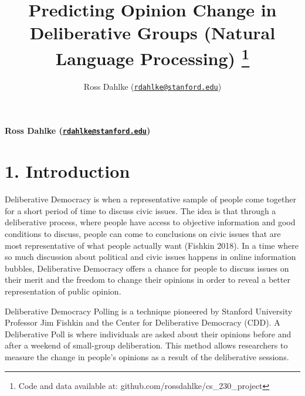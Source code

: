 \documentclass[12pt,]{article}
\title{Predicting Opinion Change in Deliberative Groups (Natural Language
Processing) \thanks{Code and data available at: github.com/rossdahlke/cs\_230\_project}  }
\author{\Large Ross Dahlke
(\href{mailto:rdahlke@stanford.edu}{\nolinkurl{rdahlke@stanford.edu}})\vspace{0.05in} \newline\normalsize\emph{}  }
\date{}
\newcommand*{\authorfont}{\fontfamily{phv}\selectfont}
\begin{document}
	
%

{%
\setlength{\parindent}{0pt}
\thispagestyle{plain}
{\fontsize{18}{20}\selectfont\raggedright 
\maketitle  %

}

{
   \vskip 13.5pt\relax \normalsize\fontsize{11}{12} 
\textbf{\authorfont Ross Dahlke
(\href{mailto:rdahlke@stanford.edu}{\nolinkurl{rdahlke@stanford.edu}})} \hskip 15pt \emph{\small }   

}

}






\vskip -8.5pt



\noindent \singlespacing 

\hypertarget{introduction}{%
\section{1. Introduction}\label{introduction}}

Deliberative Democracy is when a representative sample of people come
together for a short period of time to discuss civic issues. The idea is
that through a deliberative process, where people have access to
objective information and good conditions to discuss, people can come to
conclusions on civic issues that are most representative of what people
actually want (Fishkin 2018). In a time where so much discussion about
political and civic issues happens in online information bubbles,
Deliberative Democracy offers a chance for people to discuss issues on
their merit and the freedom to change their opinions in order to reveal
a better representation of public opinion.

Deliberative Democracy Polling is a technique pioneered by Stanford
University Professor Jim Fishkin and the Center for Deliberative
Democracy (CDD). A Deliberative Poll is where individuals are asked
about their opinions before and after a weekend of small-group
deliberation. This method allows researchers to measure the change in
people's opinions as a result of the deliberative sessions.
\end{document}
